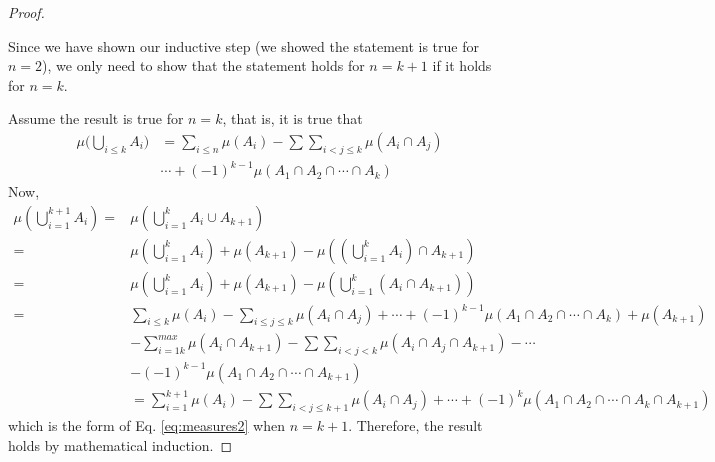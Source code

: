\begin{proof}
\begin{notes}
\end{notes}

Since we have shown our inductive step (we showed the statement is true for $n=2$), we only need to show that the statement holds for $n=k+1$ if it holds for $n=k$.

Assume the result is true for $n=k$, that is, it is true that
\begin{equation}
\begin{aligned}
\mu\Biggl(\bigcup_{i\leq k}A_i\Biggl)&=\sum_{i\leq n}\mu(A_i)-\sum\sum_{i<j\leq k} \mu(A_i\cap A_j)\\
&\cdots+(-1)^{k-1}\mu(A_1\cap A_2\cap\cdots\cap A_k)
\end{aligned}
\end{equation}
Now,
\begin{align*}
\mu\left(\bigcup_{i=1}^{k+1}A_i\right)=&\mu\left(\bigcup_{i=1}^k A_i\cup A_{k+1}\right)\\
 =&\mu\left(\bigcup_{i=1}^k A_i\right)+\mu(A_{k+1})-\mu\left(\left(\bigcup_{i=1}^k A_i\right) \cap A_{k+1}\right)\\
 =&\mu\left(\bigcup_{i=1}^k A_i\right)+\mu(A_{k+1})-\mu\left(\bigcup_{i=1}^k (A_i\cap A_{k+1}) \right)\\
 =&\sum_{i\leq k} \mu(A_i)-\sum_{i\leq j\leq k} \mu(A_i\cap A_j)+\cdots + (-1)^{k-1}\mu(A_1\cap A_2\cap \cdots \cap A_k)+\mu(A_{k+1})\\
 &-\sum_{i=1k}^{max}\mu(A_i\cap A_{k+1})-\sum\sum_{i<j<k} \mu(A_i\cap A_j \cap A_{k+1})-\cdots \\
 &-(-1)^{k-1}\mu(A_1\cap A_2\cap \cdots \cap A_{k+1})\\
 &=\sum_{i=1}^{k+1}\mu(A_i)-\sum\sum_{i<j\leq k+1}\mu(A_i\cap A_j)+\cdots+(-1)^k\mu(A_1\cap A_2\cap \cdots \cap A_k\cap A_{k+1})
\end{align*}
which is the form of Eq. \eqref{eq:measures2} when $n=k+1$. Therefore, the result holds by mathematical induction.
\end{proof}

